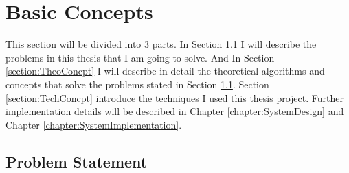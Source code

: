 \chapter{Basic Concepts}
\label{chapter:BasicConcepts}

This section will be divided into 3 parts. In Section \ref{section:ProbStat} I will describe the problems in this thesis that I am going to solve. And In Section \ref{section:TheoConcpt} I will describe in detail the theoretical algorithms and concepts that solve the problems stated in Section \ref{section:ProbStat}. Section \ref{section:TechConcpt} introduce the techniques I used this thesis project. Further implementation details will be described in Chapter \ref{chapter:SystemDesign} and Chapter \ref{chapter:SystemImplementation}. 

\section{Problem Statement}
\label{section:ProbStat}


